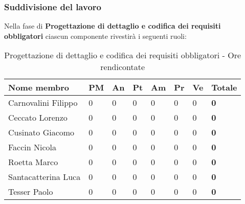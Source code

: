 		\subsubsection{Suddivisione del lavoro} %
		\label{ssub:suddivisione_del_lavoro}
		Nella fase di \textbf{Progettazione di dettaglio e codifica dei requisiti obbligatori} ciascun componente rivestirà i seguenti ruoli: \\
			\begin{table}[!h]
				\begin{center}
					\begin{tabularx}{0.9\textwidth}{|l|l|l|l|l|l|l|X|}
						\hline
						\textbf{Nome membro} & \textbf{PM} & \textbf{An} & \textbf{Pt} & \textbf{Am} & \textbf{Pr} & \textbf{Ve} & \textbf{Totale} \\
						\hline
						Carnovalini Filippo & 0 & 0 & 0 & 0 & 0 & 0 & \textbf{0} \\
						\hline
						Ceccato Lorenzo & 0 & 0 & 0 & 0 & 0 & 0 & \textbf{0} \\
						\hline
						Cusinato Giacomo & 0 & 0 & 0 & 0 & 0 & 0 & \textbf{0} \\
						\hline
						Faccin Nicola & 0 & 0 & 0 & 0 & 0 & 0 & \textbf{0} \\
						\hline
						Roetta Marco & 0 & 0 & 0 & 0 & 0 & 0 & \textbf{0} \\
						\hline
						Santacatterina Luca & 0 & 0 & 0 & 0 & 0 & 0 & \textbf{0} \\
						\hline
						Tesser Paolo & 0 & 0 & 0 & 0 & 0 & 0 & \textbf{0} \\
						\hline	
					\end{tabularx}
				\end{center}
			\caption{Progettazione di dettaglio e codifica dei requisiti obbligatori - Ore rendicontate}
			\end{table}
		
